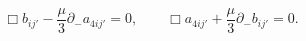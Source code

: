 \begin{equation}\label{coup5}
\Box b_{ij'} - \frac{\mu}3 \partial_- a_{4ij'} = 0, \qquad \Box
a_{4ij'} + \frac{\mu}3\partial_- b_{ij'} = 0.
\end{equation}

